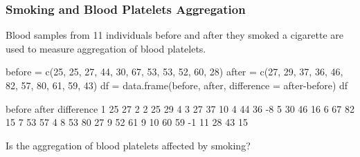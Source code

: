 \documentclass[a4paper]{article}\usepackage[]{graphicx}\usepackage[]{xcolor}
\begin{document}
\subsubsection{Smoking and Blood Platelets Aggregation}
	Blood samples from 11 individuals before and after they smoked a cigarette are used to measure aggregation of blood platelets.
\begin{Schunk}
\begin{Sinput}
before = c(25, 25, 27, 44, 30, 67, 53, 53, 52, 60, 28)
after =  c(27, 29, 37, 36, 46, 82, 57, 80, 61, 59, 43)
df = data.frame(before, after,
                difference = after-before)
df
\end{Sinput}
\begin{Soutput}
   before after difference
1      25    27          2
2      25    29          4
3      27    37         10
4      44    36         -8
5      30    46         16
6      67    82         15
7      53    57          4
8      53    80         27
9      52    61          9
10     60    59         -1
11     28    43         15
\end{Soutput}
\end{Schunk}
\begin{goldbox}
	Is the aggregation of blood platelets affected by smoking?
\end{goldbox}
\end{document}
